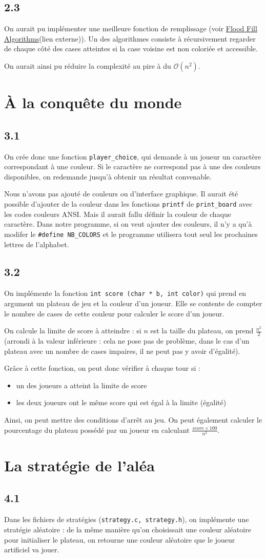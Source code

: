 \documentclass[12pt]{article}
\def\question#1{\subsection*{#1}}
\def\sec#1{\section{#1}}
\begin{document}
\question{2.3}

On aurait pu implémenter une meilleure fonction de remplissage (voir \href{https://en.wikipedia.org/wiki/Flood_fill}{Flood Fill Algorithms}(lien externe)). Un des algorithmes consiste à récursivement regarder de chaque côté des cases atteintes si la case voisine est non coloriée et accessible.

On aurait ainsi pu réduire la complexité au pire à du $\mathcal{O}(n^2)$.


\sec{À la conquête du monde}
\question{3.1}
On crée donc une fonction \texttt{player\_choice}, qui demande à un joueur un caractère correspondant à une couleur. Si le caractère ne correspond pas à une des couleurs disponibles, on redemande jusqu'à obtenir un résultat convenable.

Nous n'avons pas ajouté de couleurs ou d'interface graphique. Il aurait été possible d'ajouter de la couleur dans les fonctions \texttt{printf} de \texttt{print\_board} avec les codes couleurs ANSI. Mais il aurait fallu définir la couleur de chaque caractère. Dans notre programme, si on veut ajouter des couleurs, il n'y a qu'à modifer le \texttt{\#define NB\_COLORS} et le programme utilisera tout seul les prochaines lettres de l'alphabet.


\question{3.2}
On implémente la fonction \texttt{int score (char * b, int color)} qui prend en argument un plateau de jeu et la couleur d'un joueur. Elle se contente de compter le nombre de cases de cette couleur pour calculer le score d'un joueur.

On calcule la limite de score à atteindre : si $n$ est la taille du plateau, on prend $\frac{n^2}{2}$ (arrondi à la valeur inférieure : cela ne pose pas de problème, dans le cas d'un plateau avec un nombre de cases impaires, il ne peut pas y avoir d'égalité).

Grâce à cette fonction, on peut donc vérifier à chaque tour si :
\begin{itemize}
\item un des joueurs a atteint la limite de score
\item les deux joueurs ont le même score qui est égal à la limite (égalité)
\end{itemize}

Ainsi, on peut mettre des conditions d'arrêt au jeu.
On peut également calculer le pourcentage du plateau possédé par un joueur en calculant $\frac{score \times 100}{n^2}$.

\sec{La stratégie de l'aléa}
\question{4.1}
Dans les fichiers de stratégies (\texttt{strategy.c, strategy.h}), on implémente une stratégie aléatoire : de la même manière qu'on choisissait une couleur aléatoire pour initialiser le plateau, on retourne une couleur aléatoire que le joueur artificiel va jouer.
\end{document}
